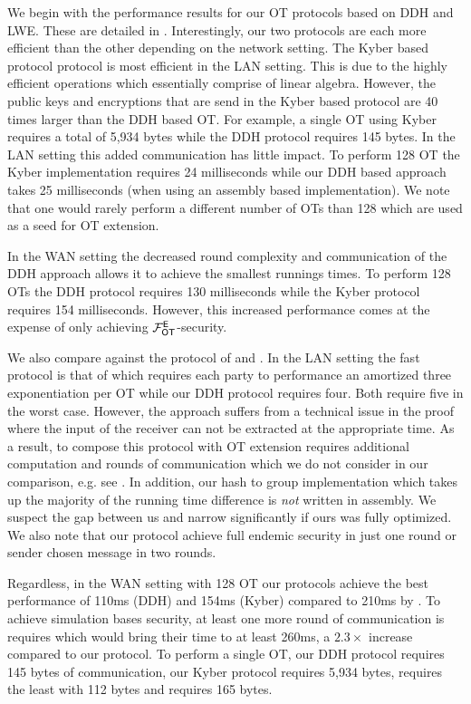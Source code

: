 We begin with the performance results for our OT protocols based on DDH and LWE. These are detailed in . Interestingly, our two protocols are each more efficient than the other depending on the network setting. The Kyber based protocol protocol is most efficient in the LAN setting. This is due to the highly efficient operations which essentially comprise of linear algebra. However, the public keys and encryptions that are send in the Kyber based protocol are 40 times larger than the DDH based OT. For example, a single OT using Kyber requires a total of 5,934 bytes while the DDH protocol requires 145 bytes. In the LAN setting this added communication has little impact. To perform 128 OT the Kyber implementation requires 24 milliseconds while our DDH based approach takes 25 milliseconds (when using an assembly based implementation). We note that one would rarely perform a different number of OTs than 128 which are used as a seed for OT extension.

In the WAN setting the decreased round complexity and communication of the DDH approach allows it to achieve the smallest runnings times. To perform 128 OTs the DDH protocol requires 130 milliseconds while the Kyber protocol requires 154 milliseconds. However, this increased performance comes at the expense of only achieving $\mathcal{F}_{\mathsf{OT}}^\mathsf{E}$-security. 

We also compare against the protocol of \cite{LC:ChoOrl15} and \cite{SODA:NaoPin01}. In the LAN setting the fast protocol is that of  \cite{LC:ChoOrl15} which requires each party to performance an amortized three exponentiation per OT while our DDH protocol requires four. Both require five in the worst case. However, the \cite{LC:ChoOrl15} approach suffers from a technical issue in the proof where the input of the receiver can not be extracted at the appropriate time. As a result, to compose this protocol with OT extension requires additional computation and rounds of communication which we do not consider in our comparison, e.g. see \cite[Appendix A]{SP:DKLS18}. In addition, our hash to group implementation which takes up the majority of the running time difference is \emph{not} written in assembly. We suspect the gap between us and \cite{LC:ChoOrl15} narrow significantly if ours was fully optimized. We also note that our protocol achieve full endemic security in just one round or sender chosen message in two rounds. 

Regardless, in the WAN setting with 128 OT our protocols achieve the best performance of 110ms (DDH) and 154ms (Kyber) compared to 210ms by  \cite{LC:ChoOrl15}. To achieve simulation bases security, at least one more round of communication is requires which would bring their time to at least 260ms, a $2.3\times$ increase compared to our protocol. To perform a single OT, our DDH protocol requires 145 bytes of communication, our Kyber protocol requires 5,934 bytes, \cite{LC:ChoOrl15} requires  the least with 112 bytes and \cite{SODA:NaoPin01} requires 165 bytes.


